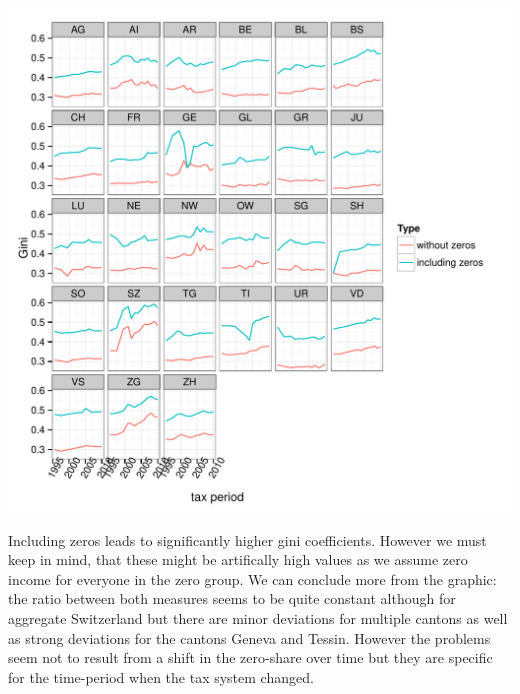 \documentclass[twoside]{article}\usepackage[]{graphicx}\usepackage[]{color}
\makeatletter
\def\maxwidth{ %
  \ifdim\Gin@nat@width>\linewidth
    \linewidth
  \else
    \Gin@nat@width
  \fi
}
\newenvironment{kframe}{%
 \def\at@end@of@kframe{}%
 \ifinner\ifhmode%
  \def\at@end@of@kframe{\end{minipage}}%
  \begin{minipage}{\columnwidth}%
 \fi\fi%
 \def\FrameCommand##1{\hskip\@totalleftmargin \hskip-\fboxsep
 \colorbox{shadecolor}{##1}\hskip-\fboxsep
     \hskip-\linewidth \hskip-\@totalleftmargin \hskip\columnwidth}%
 \MakeFramed {\advance\hsize-\width
   \@totalleftmargin\z@ \linewidth\hsize
   \@setminipage}}%
 {\par\unskip\endMakeFramed%
 \at@end@of@kframe}
\newenvironment{knitrout}{}{} %
\makeatother
\begin{document}
\begin{multicols}{2}
\begin{knitrout}
\begin{kframe}
{\ttfamily\noindent\itshape\color{messagecolor}{\#\# 'opts' is deprecated. Use 'theme' instead. (Deprecated; last used in version 0.9.1)\\\#\# theme\_text is deprecated. Use 'element\_text' instead. (Deprecated; last used in version 0.9.1)}}\end{kframe}
\includegraphics[width=\maxwidth]{figure/with_without_zeros2} 

\end{knitrout}


Including zeros leads to significantly higher gini coefficients. However we must keep in mind, that these might be artifically high values as we assume zero income for everyone in the zero group. We can conclude more from the graphic: the ratio between both measures seems to be quite constant although for aggregate Switzerland but there are minor deviations for multiple cantons as well as strong deviations for the cantons Geneva and Tessin. However the problems seem not to result from a shift in the zero-share over time but they are specific for the time-period when the tax system changed. 



\end{multicols}
\end{document}
